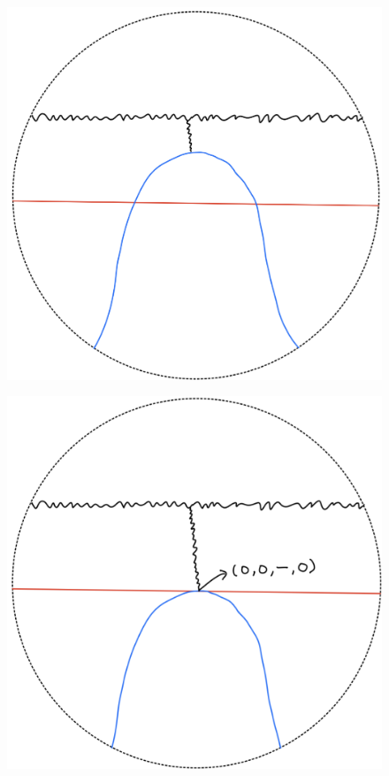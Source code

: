 \begin{definition}
\begin{enumerate}
\begin{itemize}
\begin{figure}[H]
    \caption{}
    \label{fig:your-label}
\end{figure}
\begin{figure}[H]
    \centering
    \includegraphics[scale = 0.95]{diagrams/lemma2/24.png} 
    \caption{}
    \label{fig:your-label}
\end{figure}
\begin{figure}[H]
    \centering
    \includegraphics[scale = 0.95]{diagrams/lemma2/25.png} 

\end{figure}
\end{itemize}
\end{enumerate}
\end{definition}
